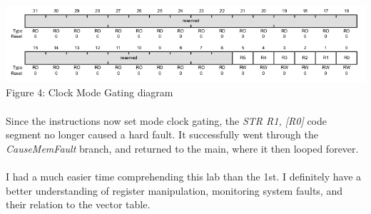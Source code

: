 \documentclass[12pt,a4paper]{report}
\begin{document}
\begin{center}
\includegraphics[scale=0.5]{img/mcg.png} \\
\small{Figure 4: Clock Mode Gating diagram}
\end{center}

\paragraph{}
Since the instructions now set mode clock gating, the \emph{STR     R1, [R0]} code segment no longer caused a hard fault. It successfully went through the \emph{CauseMemFault} branch, and returned to the main, where it then looped forever. 

\paragraph{}
I had a much easier time comprehending this lab than the 1st. I definitely have a better understanding of register manipulation, monitoring system faults, and their relation to the vector table. 
\end{document}
